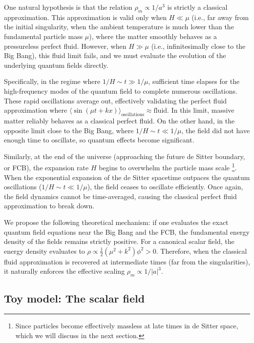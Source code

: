 One natural hypothesis is that the relation $\rho_m\propto 1/a^3$ is strictly a classical approximation. This approximation is valid only when $H\ll \mu$ (i.e., far away from the initial singularity, when the ambient temperature is much lower than the fundamental particle mass $\mu$), where the matter smoothly behaves as a pressureless perfect fluid. However, when $H\gg \mu$ (i.e., infinitesimally close to the Big Bang), this fluid limit fails, and we must evaluate the evolution of the underlying quantum fields directly.

Specifically, in the regime where $1/H \sim t \gg 1/\mu$, sufficient time elapses for the high-frequency modes of the quantum field to complete numerous oscillations. These rapid oscillations average out, effectively validating the perfect fluid approximation where $\langle \sin(\mu t + kx) \rangle_{\text{oscillations}} \approx \text{fluid}$. In this limit, massive matter reliably behaves as a classical perfect fluid. On the other hand, in the opposite limit close to the Big Bang, where $1/H \sim t \ll 1/\mu$, the field did not have enough time to oscillate, so quantum effects become significant. 

Similarly, at the end of the universe (approaching the future de Sitter boundary, or FCB), the expansion rate $H$ begins to overwhelm the particle mass scale \footnote{Since particles become effectively massless at late times in de Sitter space, which we will discuss in the next section.}. When the exponential expansion of the de Sitter spacetime outpaces the quantum oscillations ($1/H \sim t \ll 1/\mu$), the field ceases to oscillate efficiently. Once again, the field dynamics cannot be time-averaged, causing the classical perfect fluid approximation to break down.

We propose the following theoretical mechanism: if one evaluates the exact quantum field equations near the Big Bang and the FCB, the fundamental energy density of the fields remains strictly positive. For a canonical scalar field, the energy density evaluates to $\rho \propto \frac{1}{2}(\mu^2 + k^2)\phi^2 > 0$. Therefore, when the classical fluid approximation is recovered at intermediate times (far from the singularities), it naturally enforces the effective scaling $\rho_m\propto 1/|a|^3$.

\subsection{Toy model: The scalar field}

